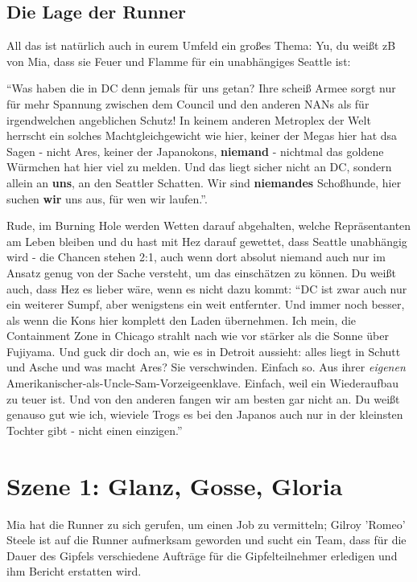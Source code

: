 \subsection{Die Lage der Runner}

All das ist natürlich auch in eurem Umfeld ein großes Thema: Yu, du weißt zB von Mia, dass sie Feuer und Flamme für ein unabhängiges Seattle ist:

``Was haben die in DC denn jemals für uns getan? Ihre scheiß Armee sorgt nur für mehr Spannung zwischen dem Council und den anderen NANs als für irgendwelchen angeblichen Schutz! In keinem anderen Metroplex der Welt herrscht ein solches Machtgleichgewicht wie hier, keiner der Megas hier hat dsa Sagen - nicht Ares, keiner der Japanokons, \textbf{niemand} - nichtmal das goldene Würmchen hat hier viel zu melden. Und das liegt sicher nicht an DC, sondern allein an \textbf{uns}, an den Seattler Schatten. Wir sind \textbf{niemandes} Schoßhunde, hier suchen \textbf{wir} uns aus, für wen wir laufen.''. 

Rude, im Burning Hole werden Wetten darauf abgehalten, welche Repräsentanten am Leben bleiben und du hast mit Hez darauf gewettet, dass Seattle unabhängig wird - die Chancen stehen 2:1, auch wenn dort absolut niemand auch nur im Ansatz genug von der Sache versteht, um das einschätzen zu können. Du weißt auch, dass Hez es lieber wäre, wenn es nicht dazu kommt: ``DC ist zwar auch nur ein weiterer Sumpf, aber wenigstens ein weit entfernter. Und immer noch besser, als wenn die Kons hier komplett den Laden übernehmen. Ich mein, die Containment Zone in Chicago strahlt nach wie vor stärker als die Sonne über Fujiyama. Und guck dir doch an, wie es in Detroit aussieht: alles liegt in Schutt und Asche und was macht Ares? Sie verschwinden. Einfach so. Aus ihrer \textit{eigenen} Amerikanischer-als-Uncle-Sam-Vorzeigeenklave. Einfach, weil ein Wiederaufbau zu teuer ist. Und von den anderen fangen wir am besten gar nicht an. Du weißt genauso gut wie ich, wieviele Trogs es bei den Japanos auch nur in der kleinsten Tochter gibt - nicht einen einzigen.''




\section{Szene 1: Glanz, Gosse, Gloria}

Mia hat die Runner zu sich gerufen, um einen Job zu vermitteln; Gilroy 'Romeo' Steele ist auf die Runner aufmerksam geworden und sucht ein Team, dass für die Dauer des Gipfels verschiedene Aufträge für die Gipfelteilnehmer erledigen und ihm Bericht erstatten wird.


